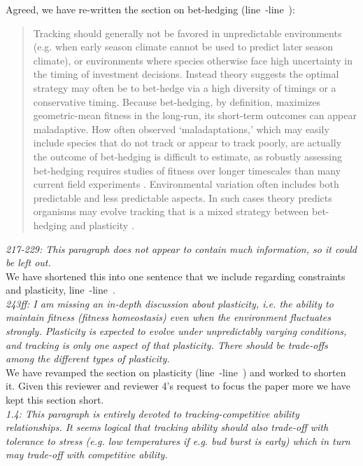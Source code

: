 \documentclass[11pt]{article}
\newcommand{\lr}[1]{line~\lineref{#1}}
\begin{document}
Agreed, we have re-written the section on bet-hedging (\lr{bhS}-\lr{bhE}): 
\begin{quote}
Tracking should generally not be favored in unpredictable environments (e.g. when early season climate cannot be used to predict later season climate), or environments where species otherwise face high uncertainty in the timing of investment decisions. Instead theory suggests the optimal strategy may often be to bet-hedge \citep{Venable:2007os,donald2013,decasas2015} via a high diversity of timings or a conservative timing. Because bet-hedging, by definition, maximizes geometric-mean fitness in the long-run, its short-term outcomes can appear maladaptive. How often observed `maladaptations,' which may easily include species that do not track or appear to track poorly, are actually the outcome of bet-hedging is difficult to estimate, as robustly assessing bet-hedging requires studies of fitness over longer timescales than many current field experiments \citep{simons2011}. Environmental variation often includes both predictable and less predictable aspects. In such cases theory predicts organisms may evolve tracking that is a mixed strategy between bet-hedging and plasticity \citep{wong2005}.
\end{quote}

\emph{217-229: This paragraph does not appear to contain much information, so it could be left out.}\\

We have shortened this into one sentence that we include regarding constraints and plasticity, \lr{r1consS}-\lr{r1consE}.\\

\emph{243ff: I am missing an in-depth discussion about plasticity, i.e. the ability to maintain
fitness (fitness homeostasis) even when the environment fluctuates strongly. Plasticity is
expected to evolve under unpredictably varying conditions, and tracking is only one aspect of
that plasticity. There should be trade-offs among the different types of plasticity.}\\

We have revamped the section on plasticity (\lr{plasS}-\lr{plasE}) and worked to shorten it. Given this reviewer and reviewer 4's request to focus the paper more we have kept this section short.\\

\emph{1.4: This paragraph is entirely devoted to tracking-competitive ability relationships. It
seems logical that tracking ability should also trade-off with tolerance to stress (e.g. low
temperatures if e.g. bud burst is early) which in turn may trade-off with competitive
ability.}\\
\end{document}
